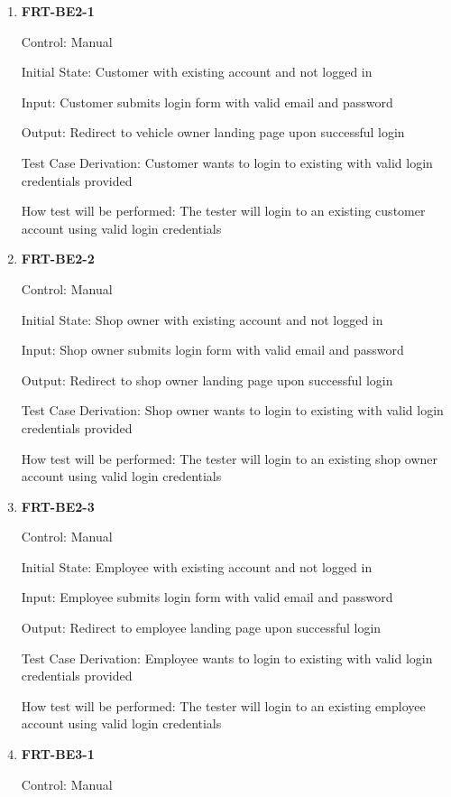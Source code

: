 \documentclass[12pt, titlepage]{article}
\begin{document}
\begin{enumerate}
	\item \textbf{FRT-BE2-1}

	      Control: Manual

	      Initial State: Customer with existing account and not logged in

	      Input: Customer submits login form with valid email and password

	      Output: Redirect to vehicle owner landing page upon successful login

	      Test Case Derivation: Customer wants to login to existing with valid login credentials provided

	      How test will be performed: The tester will login to an existing customer account using valid login
	      credentials

	\item \textbf{FRT-BE2-2}

	      Control: Manual

	      Initial State: Shop owner with existing account and not logged in

	      Input: Shop owner submits login form with valid email and password

	      Output: Redirect to shop owner landing page upon successful login

	      Test Case Derivation: Shop owner wants to login to existing with valid login credentials provided

	      How test will be performed: The tester will login to an existing shop owner account using valid
	      login credentials

	\item \textbf{FRT-BE2-3}

	      Control: Manual

	      Initial State: Employee with existing account and not logged in

	      Input: Employee submits login form with valid email and password

	      Output: Redirect to employee landing page upon successful login

	      Test Case Derivation: Employee wants to login to existing with valid login credentials provided

	      How test will be performed: The tester will login to an existing employee account using valid login
	      credentials

	\item \textbf{FRT-BE3-1}

	      Control: Manual


\end{enumerate}
\end{document}
